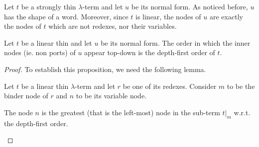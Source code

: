 Let $t$ be a strongly thin $\lambda$-term and let $u$ be its normal form. As noticed before, $u$ has the shape of a word. Moreover, since $t$ is linear, the nodes of $u$ are exactly the nodes of $t$ which are not redexes, nor their variables.

\begin{proposition}\label{prop:normal-form-depth-first} Let $t$ be a linear thin \lambdaterm and let $u$ be its normal form. 
The order in which the inner nodes (ie. non ports) of $u$ appear top-down is the depth-first order of $t$.  
\end{proposition}

\begin{proof}
To establish this proposition, we need the following lemma.
\begin{lemma}\label{lem:internalLemma}
Let $t$ be a linear thin $\lambda$-term and let $r$ be one of its redexes. Consider $m$ to be the binder node of $r$ and $n$ to be its variable node.

The node $n$ is the greatest (that is the left-most) node in the sub-term $t|_m$ w.r.t. the depth-first order. 
\end{lemma}


\end{proof}
